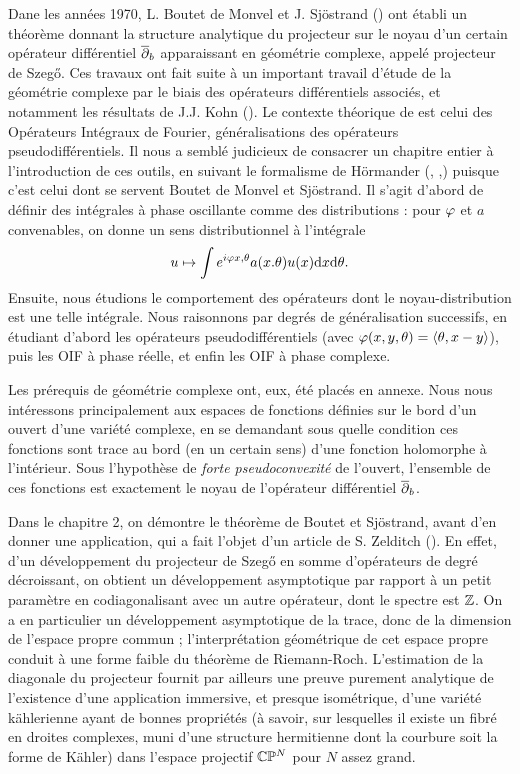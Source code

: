 Dane les années 1970, L. Boutet de Monvel et J. Sj\"ostrand (\cite{BoutetdeMonvel1975}) ont établi un théorème donnant la structure analytique du projecteur sur le noyau d'un certain opérateur différentiel $\overline{\partial}_b$ apparaissant en géométrie complexe, appelé projecteur de Szeg\H{o}. Ces travaux ont fait suite à un important travail d'étude de la géométrie complexe par le biais des opérateurs différentiels associés, et notamment les résultats de J.J. Kohn (\cite{kohn1965extension}). Le contexte théorique de \cite{BoutetdeMonvel1975} est celui des Opérateurs Intégraux de Fourier, généralisations des opérateurs pseudodifférentiels. Il nous a semblé judicieux de consacrer un chapitre entier à l'introduction de ces outils, en suivant le formalisme de H\"ormander (\cite{hormander2007}, \cite{hormander1985},\cite{hormander2003analysis}) puisque c'est celui dont se servent Boutet de Monvel et Sj\"ostrand. Il s'agit d'abord de définir des intégrales à phase oscillante comme des distributions : pour $\varphi$ et $a$ convenables, on donne un sens distributionnel à l'intégrale 
\begin{equation*}
	u \mapsto \int e^{i\varphi{x,\theta}}a(x.\theta)u(x)\mathrm{d} x \mathrm{d} \theta.
\end{equation*}
Ensuite, nous étudions le comportement des opérateurs dont le noyau-distribution est une telle intégrale. Nous raisonnons par degrés de généralisation successifs, en étudiant d'abord les opérateurs pseudodifférentiels (avec $\varphi(x,y,\theta)=\langle \theta, x-y \rangle $), puis les OIF à phase réelle, et enfin les OIF à phase complexe.

Les prérequis de géométrie complexe ont, eux, été placés en annexe. Nous nous intéressons principalement aux espaces de fonctions définies sur le bord d'un ouvert d'une variété complexe, en se demandant sous quelle condition ces fonctions sont trace au bord (en un certain sens) d'une fonction holomorphe à l'intérieur. Sous l'hypothèse de \emph{forte pseudoconvexité} de l'ouvert, l'ensemble de ces fonctions est exactement le noyau de l'opérateur différentiel $\overline{\partial}_b$.

Dans le chapitre 2, on démontre le théorème de Boutet et Sj\"ostrand, avant d'en donner une application, qui a fait l'objet d'un article de S. Zelditch (\cite{Zelditch2000}). En effet, d'un développement du projecteur de Szeg\H{o} en somme d'opérateurs de degré décroissant, on obtient un développement asymptotique par rapport à un petit paramètre en codiagonalisant avec un autre opérateur, dont le spectre est $\mathbb{Z}$. On a en particulier un développement asymptotique de la trace, donc de la dimension de l'espace propre commun ; l'interprétation géométrique de cet espace propre conduit à une forme faible du théorème de Riemann-Roch. L'estimation de la diagonale du projecteur fournit par ailleurs une preuve purement analytique de l'existence d'une application immersive, et presque isométrique, d'une variété k\"ahlerienne ayant de bonnes propriétés (à savoir, sur lesquelles il existe un fibré en droites complexes, muni d'une structure hermitienne dont la courbure soit la forme de K\"ahler) dans l'espace projectif $\mathbb{C}\mathbb{P}^N$ pour $N$ assez grand.

